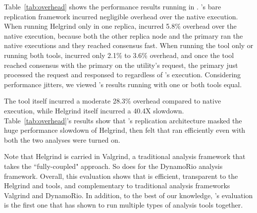 Table~\ref{tab:overhead} shows the performance results running \clamav in 
\xxx. \xxx's bare replication framework incurred negligible overhead over 
the native execution. When running Helgrind only in one 
replica, \xxx incurred 5.8\% overhead over the native execution, because both 
the other replica node and the primary ran the native executions and they 
reached consensus fast. When running the \drcov tool only or running both 
tools, \xxx incurred only 2.1\% to 3.6\% overhead, and once the \drcov tool 
reached consensus with the primary on the \clamdscan utility's request, the 
primary just processed the request and responsed to \clamdscan regardless of 
\drcov's execution. Considering performance jitters, we viewed \xxx's 
results running with one or both tools equal.

The \drcov tool itself incurred a moderate 28.3\% overhead compared to native 
execution, while Helgrind itself incurred a 40.4X slowdown. 
Table~\ref{tab:overhead}'s results show that \xxx's replication architecture 
masked the huge performance slowdown of Helgrind, then \clamdscan felt that 
\clamav ran efficiently even with both the two analyses were turned on.

Note that Helgrind is carried in Valgrind, a traditional analysis 
framework that takes the ``fully-coupled" approach. So does \drcov for the 
DynamoRio analysis framework. Overall, this evaluation shows that \xxx is 
efficient, transparent to the 
Helgrind and \drcov tools, and complementary to traditional analysis frameworks 
Valgrind and DynamoRio. In addition, to the best of our knowledge, \xxx's 
evaluation is the first one that has shown to run multiple types of analysis 
tools together.
